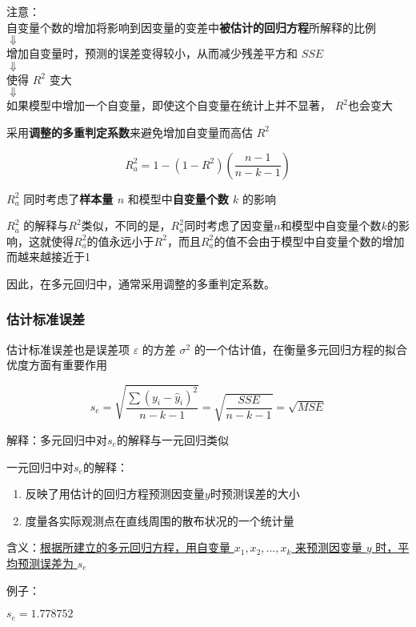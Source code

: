 \documentclass[UTF8,10pt]{book}
\begin{document}
{注意：\\
自变量个数的增加将影响到因变量的变差中\textbf{被估计的回归方程}所解释的比例 \\
$\Downarrow$ \\
增加自变量时，预测的误差变得较小，从而减少残差平方和 \(SSE\)  \\
$\Downarrow$ \\
使得 \(R^2\) 变大 \\
$\Downarrow$ \\
如果模型中增加一个自变量，即使这个自变量在统计上并不显著， \(R^2\)也会变大

采用\textbf{调整的多重判定系数}来避免增加自变量而高估 \(R^2\)

\[R_a^2 =1-(1-R^2)(\frac{n-1}{n-k-1})\]

\(R_a^2\) 同时考虑了\textbf{样本量 \( n\) }和模型中\textbf{自变量个数
	\(k\) }的影响

\(R_a^2\)
的解释与\(R^2\)类似，不同的是，\(R_a^2\)同时考虑了因变量\(n\)和模型中自变量个数\(k\)的影响，这就使得\(R_a^2\)的值永远小于\(R^2\)，而且\(R_a^2\)的值不会由于模型中自变量个数的增加而越来越接近于1

因此，在多元回归中，通常采用调整的多重判定系数。

\subsubsection{估计标准误差}\label{header-n210}

估计标准误差也是误差项 \(\varepsilon\) 的方差 \( \sigma^2 \)
的一个估计值，在衡量多元回归方程的拟合优度方面有重要作用

\[s_{e}=\sqrt{\frac{\sum\left(y_{i}-\hat{y}_{i}\right)^{2}}{n-k-1}}=\sqrt{\frac{S S E}{n-k-1}}=\sqrt{M S E}\]

解释：多元回归中对\(s_e\)的解释与一元回归类似

一元回归中对\(s_e\)的解释：

\begin{enumerate}
	\def\labelenumi{\arabic{enumi}.}
	\item
	反映了用估计的回归方程预测因变量\(y\)时预测误差的大小
	\item
	度量各实际观测点在直线周围的散布状况的一个统计量
\end{enumerate}

含义：\underline{根据所建立的多元回归方程，用自变量 \(x_1,x_2,...,x_k\)
来预测因变量 \(y\) 时，平均预测误差为 \(s_e\)}

{\kaishu
例子：

\(s_e = 1.778752\)

}}
\end{document}
